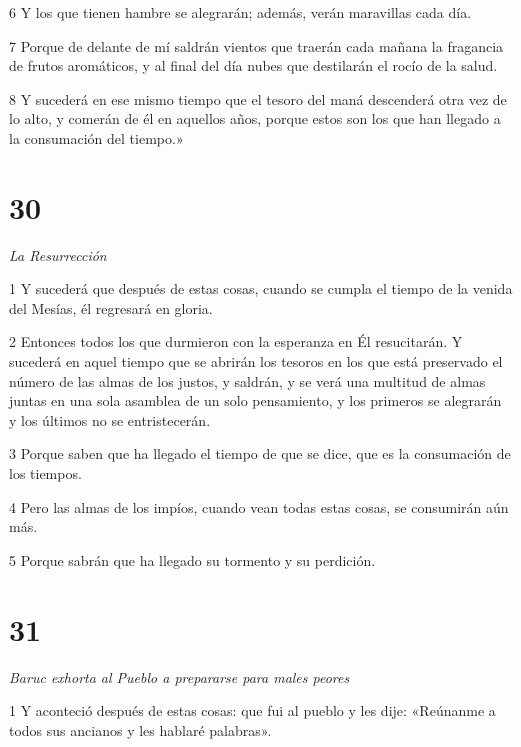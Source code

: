 \par 6 Y los que tienen hambre se alegrarán; además, verán maravillas cada día.

\par 7 Porque de delante de mí saldrán vientos que traerán cada mañana la fragancia de frutos aromáticos, y al final del día nubes que destilarán el rocío de la salud.

\par 8 Y sucederá en ese mismo tiempo que el tesoro del maná descenderá otra vez de lo alto, y comerán de él en aquellos años, porque estos son los que han llegado a la consumación del tiempo.»

\chapter{30}

\par \textit{La Resurrección}

\par 1 Y sucederá que después de estas cosas, cuando se cumpla el tiempo de la venida del Mesías, él regresará en gloria.

\par 2 Entonces todos los que durmieron con la esperanza en Él resucitarán. Y sucederá en aquel tiempo que se abrirán los tesoros en los que está preservado el número de las almas de los justos, y saldrán, y se verá una multitud de almas juntas en una sola asamblea de un solo pensamiento, y los primeros se alegrarán y los últimos no se entristecerán.

\par 3 Porque saben que ha llegado el tiempo de que se dice, que es la consumación de los tiempos.

\par 4 Pero las almas de los impíos, cuando vean todas estas cosas, se consumirán aún más.

\par 5 Porque sabrán que ha llegado su tormento y su perdición.

\chapter{31}

\par \textit{Baruc exhorta al Pueblo a prepararse para males peores}

\par 1 Y aconteció después de estas cosas: que fui al pueblo y les dije: «Reúnanme a todos sus ancianos y les hablaré palabras».

